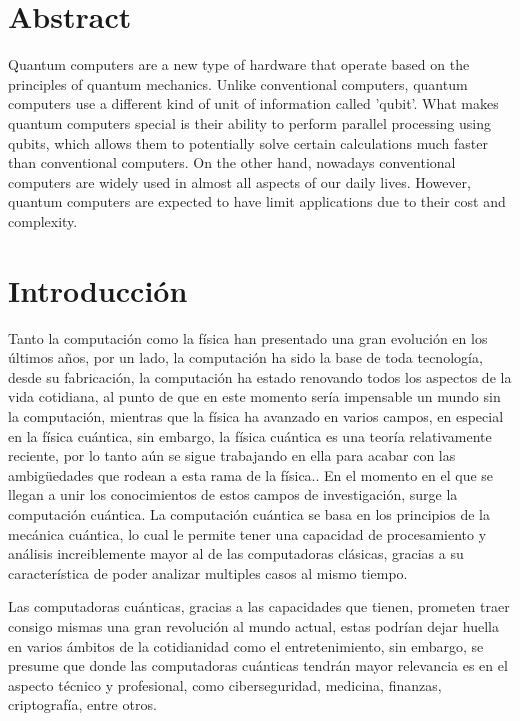 \documentclass{article}
\begin{document}


\tableofcontents


\newpage
\section{Abstract}
Quantum computers are a new type of hardware that operate based on the principles of quantum mechanics. Unlike conventional computers, quantum computers use a different kind of unit of information called 'qubit'. What makes quantum computers special is their ability to perform parallel processing using qubits, which allows them to potentially solve certain calculations much faster than conventional computers. On the other hand, nowadays conventional computers are widely used in almost all aspects of our daily lives. However, quantum computers are expected to have limit applications due to their cost and complexity.  

\newpage

\section{Introducción}
Tanto la computación como la física han presentado una gran evolución en los últimos años, por un lado, la computación ha sido la base de toda tecnología, desde su fabricación, la computación ha estado renovando todos los aspectos de la vida cotidiana, al punto de que en este momento sería impensable un mundo sin la computación, mientras que la física ha avanzado en varios campos, en especial en la física cuántica, sin embargo, la física cuántica es una teoría relativamente reciente, por lo tanto aún se sigue trabajando en ella para acabar con las ambigüedades que rodean a esta rama de la física.. En el momento en el que se llegan a unir los conocimientos de estos campos de investigación, surge la computación cuántica. La computación cuántica se basa en los principios de la mecánica cuántica, lo cual le permite tener una capacidad de procesamiento y análisis increiblemente mayor al de las computadoras clásicas, gracias a su característica de poder analizar multiples casos al mismo tiempo.

Las computadoras cuánticas, gracias a las capacidades que tienen, prometen traer consigo mismas una gran revolución al mundo actual, estas podrían dejar huella en varios ámbitos de la cotidianidad como el entretenimiento, sin embargo, se presume que donde las computadoras cuánticas tendrán mayor relevancia es en el aspecto técnico y profesional, como ciberseguridad, medicina, finanzas, criptografía, entre otros.
\end{document}
